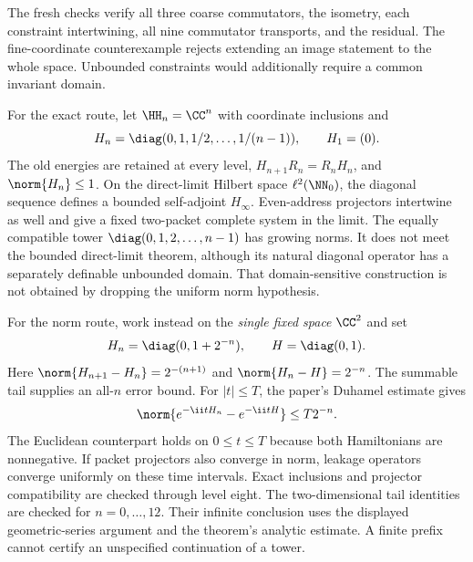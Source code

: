 The fresh checks verify all three coarse commutators, the isometry, each constraint intertwining, all nine commutator transports, and the residual. The fine-coordinate counterexample rejects extending an image statement to the whole space. Unbounded constraints would additionally require a common invariant domain.

For the exact route, let $\HH_n=\CC^n$ with coordinate inclusions and
\[
H_n=\diag(0,1,1/2,\ldots,1/(n-1)),\qquad H_1=(0).
\]
The old energies are retained at every level, $H_{n+1}R_n=R_nH_n$, and $\norm{H_n}\leq1$. On the direct-limit Hilbert space $\ell^2(\NN_0)$, the diagonal sequence defines a bounded self-adjoint $H_\infty$. Even-address projectors intertwine as well and give a fixed two-packet complete system in the limit.
The equally compatible tower $\diag(0,1,2,\ldots,n-1)$ has growing norms. It does not meet the bounded direct-limit theorem, although its natural diagonal operator has a separately definable unbounded domain. That domain-sensitive construction is not obtained by dropping the uniform norm hypothesis.

For the norm route, work instead on the \emph{single fixed space} $\CC^2$ and set
\[
H_n=\diag(0,1+2^{-n}),\qquad H=\diag(0,1).
\]
Here $\norm{H_{n+1}-H_n}=2^{-(n+1)}$ and $\norm{H_n-H}=2^{-n}$. The summable tail supplies an all-$n$ error bound. For $|t|\leq T$, the paper's Duhamel estimate gives
\[
\norm{e^{-\ii tH_n}-e^{-\ii tH}}\leq T2^{-n}.
\]
The Euclidean counterpart holds on $0\leq t\leq T$ because both Hamiltonians are nonnegative. If packet projectors also converge in norm, leakage operators converge uniformly on these time intervals.
Exact inclusions and projector compatibility are checked through level eight. The two-dimensional tail identities are checked for $n=0,\ldots,12$. Their infinite conclusion uses the displayed geometric-series argument and the theorem's analytic estimate. A finite prefix cannot certify an unspecified continuation of a tower.

